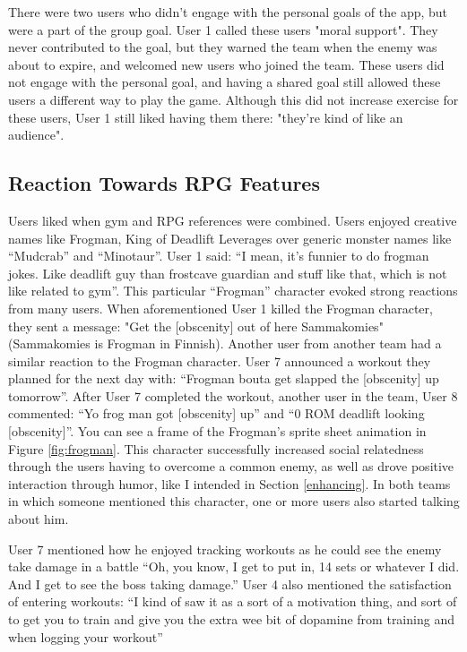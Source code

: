 \documentclass{l4proj}
\begin{document}
There were two users who didn't engage with the personal goals of the app, but were a part of the group goal. User 1 called these users "moral support". They never contributed to the goal, but they warned the team when the enemy was about to expire, and welcomed new users who joined the team. These users did not engage with the personal goal, and having a shared goal still allowed these users a different way to play the game. Although this did not increase exercise for these users, User 1 still liked having them there: "they're kind of like an audience". 

\subsection{Reaction Towards RPG Features}
Users liked when gym and RPG references were combined. Users enjoyed creative names like Frogman, King of Deadlift Leverages over generic monster names like ``Mudcrab'' and ``Minotaur''. User 1 said: ``I mean, it's funnier to do frogman jokes. Like deadlift guy than frostcave guardian and stuff like that, which is not like related to gym''. This particular ``Frogman'' character evoked strong reactions from many users. When aforementioned User 1 killed the Frogman character, they sent a message: "Get the [obscenity] out of here Sammakomies" (Sammakomies is Frogman in Finnish). Another user from another team had a similar reaction to the Frogman character. User 7 announced a workout they planned for the next day with: ``Frogman bouta get slapped the [obscenity] up tomorrow''. After User 7 completed the workout, another user in the team, User 8 commented: ``Yo frog man got [obscenity] up'' and ``0 ROM deadlift looking [obscenity]''.  You can see a frame of the Frogman's sprite sheet animation in Figure \ref{fig:frogman}. This character successfully increased social relatedness through the users having to overcome a common enemy, as well as drove positive interaction through humor, like I intended in Section \ref{enhancing}. In both teams in which someone mentioned this character, one or more users also started talking about him.

User 7 mentioned how he enjoyed tracking workouts as he could see the enemy take damage in a battle ``Oh, you know, I get to put in, 14 sets or whatever I did. And I get to see the boss taking damage.'' User 4 also mentioned the satisfaction of entering workouts: ``I kind of saw it as a sort of a motivation thing, and sort of to get you to train and give you the extra wee bit of dopamine from training and when logging your workout''
\end{document}
